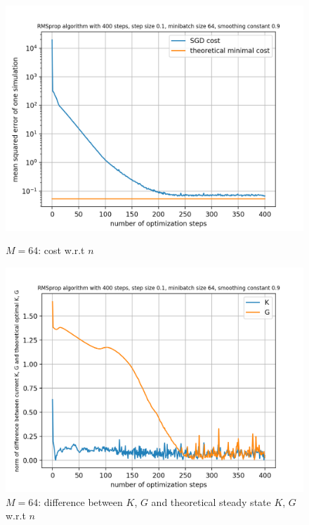 \documentclass{article}
\begin{document}
\begin{figure}[h!]
	\centering
	\begin{minipage}[t]{.28\paperwidth}
		\centering
		\includegraphics[width=1.0\textwidth]{Figures/M64.png}
		\caption{$M=64$: cost w.r.t $n$}
	\end{minipage}%
	\begin{minipage}[t]{.28\paperwidth}
		\centering
		\includegraphics[width=1.0\textwidth]{Figures/d_M64.png}
		\caption{$M=64$: difference between $K$, $G$ and theoretical steady state $K$, $G$ w.r.t $n$}
	\end{minipage}%
	\begin{minipage}[t]{.28\paperwidth}
		\centering

\end{minipage}
\end{figure}
\end{document}

